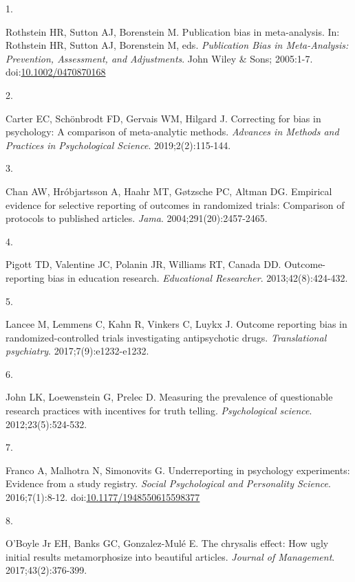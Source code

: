 \documentclass[
  american,
  man, donotrepeattitle,floatsintext]{apa7}
\newlength{\cslhangindent}
\newlength{\csllabelwidth}
\newenvironment{CSLReferences}[2] %
 {\begin{list}{}{%
  \setlength{\itemindent}{0pt}
  \setlength{\leftmargin}{0pt}
  \setlength{\parsep}{0pt}
  \ifodd #1
   \setlength{\leftmargin}{\cslhangindent}
   \setlength{\itemindent}{-1\cslhangindent}
  \fi
  \setlength{\itemsep}{#2\baselineskip}}}
 {\end{list}}
\newcommand{\CSLLeftMargin}[1]{\parbox[t]{\csllabelwidth}{\strut#1\strut}}
\newcommand{\CSLRightInline}[1]{\parbox[t]{\linewidth - \csllabelwidth}{\strut#1\strut}}
\begin{document}
\protect{}\label{refs}
\begin{CSLReferences}{0}{1}
\CSLLeftMargin{1. }%
\CSLRightInline{Rothstein HR, Sutton AJ, Borenstein M. Publication bias in meta-analysis. In: Rothstein HR, Sutton AJ, Borenstein M, eds. \emph{Publication {Bias} in {Meta-Analysis}: {Prevention}, {Assessment}, and {Adjustments}}. {John Wiley \& Sons}; 2005:1-7. doi:\href{https://doi.org/10.1002/0470870168}{10.1002/0470870168}}

\CSLLeftMargin{2. }%
\CSLRightInline{Carter EC, Schönbrodt FD, Gervais WM, Hilgard J. Correcting for bias in psychology: A comparison of meta-analytic methods. \emph{Advances in Methods and Practices in Psychological Science}. 2019;2(2):115-144.}

\CSLLeftMargin{3. }%
\CSLRightInline{Chan AW, Hróbjartsson A, Haahr MT, Gøtzsche PC, Altman DG. Empirical evidence for selective reporting of outcomes in randomized trials: Comparison of protocols to published articles. \emph{Jama}. 2004;291(20):2457-2465.}

\CSLLeftMargin{4. }%
\CSLRightInline{Pigott TD, Valentine JC, Polanin JR, Williams RT, Canada DD. Outcome-reporting bias in education research. \emph{Educational Researcher}. 2013;42(8):424-432.}

\CSLLeftMargin{5. }%
\CSLRightInline{Lancee M, Lemmens C, Kahn R, Vinkers C, Luykx J. Outcome reporting bias in randomized-controlled trials investigating antipsychotic drugs. \emph{Translational psychiatry}. 2017;7(9):e1232-e1232.}

\CSLLeftMargin{6. }%
\CSLRightInline{John LK, Loewenstein G, Prelec D. Measuring the prevalence of questionable research practices with incentives for truth telling. \emph{Psychological science}. 2012;23(5):524-532.}

\CSLLeftMargin{7. }%
\CSLRightInline{Franco A, Malhotra N, Simonovits G. Underreporting in psychology experiments: Evidence from a study registry. \emph{Social Psychological and Personality Science}. 2016;7(1):8-12. doi:\href{https://doi.org/10.1177/1948550615598377}{10.1177/1948550615598377}}

\CSLLeftMargin{8. }%
\CSLRightInline{O'Boyle Jr EH, Banks GC, Gonzalez-Mulé E. The chrysalis effect: How ugly initial results metamorphosize into beautiful articles. \emph{Journal of Management}. 2017;43(2):376-399.}


\end{CSLReferences}
\end{document}
